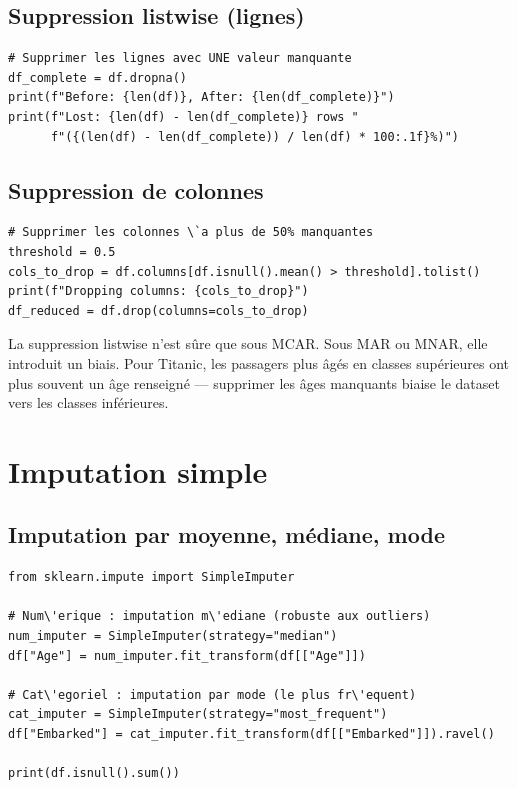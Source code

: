\subsection{Suppression listwise (lignes)}

\begin{verbatim}
# Supprimer les lignes avec UNE valeur manquante
df_complete = df.dropna()
print(f"Before: {len(df)}, After: {len(df_complete)}")
print(f"Lost: {len(df) - len(df_complete)} rows "
      f"({(len(df) - len(df_complete)) / len(df) * 100:.1f}%)")
\end{verbatim}

\subsection{Suppression de colonnes}

\begin{verbatim}
# Supprimer les colonnes \`a plus de 50% manquantes
threshold = 0.5
cols_to_drop = df.columns[df.isnull().mean() > threshold].tolist()
print(f"Dropping columns: {cols_to_drop}")
df_reduced = df.drop(columns=cols_to_drop)
\end{verbatim}

\begin{warningbox}
La suppression listwise n'est s\^ure que sous MCAR. Sous MAR ou MNAR, elle introduit un biais. Pour Titanic, les passagers plus \^ag\'es en classes sup\'erieures ont plus souvent un \^age renseign\'e --- supprimer les \^ages manquants biaise le dataset vers les classes inf\'erieures.
\end{warningbox}

\section{Imputation simple}

\subsection{Imputation par moyenne, m\'ediane, mode}

\begin{verbatim}
from sklearn.impute import SimpleImputer

# Num\'erique : imputation m\'ediane (robuste aux outliers)
num_imputer = SimpleImputer(strategy="median")
df["Age"] = num_imputer.fit_transform(df[["Age"]])

# Cat\'egoriel : imputation par mode (le plus fr\'equent)
cat_imputer = SimpleImputer(strategy="most_frequent")
df["Embarked"] = cat_imputer.fit_transform(df[["Embarked"]]).ravel()

print(df.isnull().sum())
\end{verbatim}

